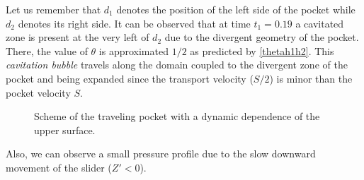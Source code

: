 Let us remember that $d_1$ denotes the position of the left side of the pocket while $d_2$ denotes its right side. It can be observed that at time $t_1=0.19$ a cavitated zone is present at the very left of $d_2$ due to the divergent geometry of the pocket. There, the value of $\theta$ is approximated $1/2$ as predicted by \eqref{thetah1h2}. This \emph{cavitation bubble} travels along the domain coupled to the divergent zone of the pocket and being expanded since the transport velocity ($S/2$) is minor than the pocket velocity $S$. 
\begin{figure}[ht!]
 \centering 
 \def\svgwidth{\textwidth}\small{
}
\caption[Profiles of $p$ and $\theta$ for different time instants with dynamic behavior of the slider]{Scheme of the traveling pocket with  a dynamic dependence of the upper surface.}\label{fig:pocket_dynamics_frames}
\end{figure}
Also, we can observe a small pressure profile due to the slow downward movement of the slider ($Z'<0$).


